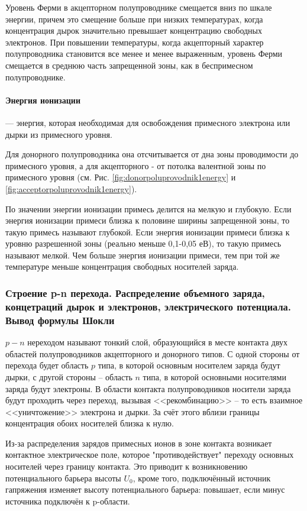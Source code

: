 Уровень Ферми в акцепторном полупроводнике смещается вниз по шкале энергии, причем это смещение больше при низких температурах, когда концентрация дырок значительно превышает концентрацию свободных электронов. При повышении температуры, когда акцепторный характер полупроводника становится все менее и менее выраженным, уровень Ферми смещается в среднюю часть запрещенной зоны, как в беспримесном полупроводнике.

\paragraph{Энергия ионизации} --- энергия, которая необходимая для освобождения примесного электрона или дырки из примесного уровня. 

Для донорного полупроводника она отсчитывается от дна зоны проводимости до примесного уровня, а для акцепторного - от потолка валентной зоны по примесного уровня (см. Рис. \ref{fig:donorpoluprovodnik1energy} и \ref{fig:acceptorpoluprovodnik1energy}).

По значении энергии ионизации примесь делится на мелкую и глубокую. Если энергия ионизации примеси близка к половине ширины запрещенной зоны, то такую примесь называют глубокой. Если энергия ионизации примеси близка к уровню разрешенной зоны (реально меньше 0,1-0,05 еВ), то такую примесь называют мелкой. Чем больше энергия ионизации примеси, тем при той же температуре меньше концентрация свободных носителей заряда.

\subsubsection{Строение p-n перехода. Распределение объемного заряда, концетраций дырок и электронов, электрического потенциала. Вывод формулы Шокли}

$p-n$ нереходом называют тонкий слой, образующийся в месте контакта двух областей полупроводников
акцепторного и донорного типов. С одной стороны от перехода будет область $p$ типа, в которой
основным носителем заряда будут дырки, с другой стороны -- область $n$ типа, в которой основными
носителями заряда будут электроны. В области контакта полупроводников носители заряда будут
проходить через переход, вызывая <<рекомбинацию>> -- то есть взаимное <<уничтожение>> электрона и дырки.
За счёт этого вблизи границы концентрация обоих носителей близка к нулю.

Из-за распределения зарядов примесных ионов в зоне контакта возникает контактное электрическое поле,
которое "противодействует" переходу основных носителей через границу контакта. Это приводит к возникновению потенциального барьера высоты $U_0$, кроме того, подключённый источник гапряжения изменяет высоту потенциального барьера: повышает, если минус источника подключён к p-области.

